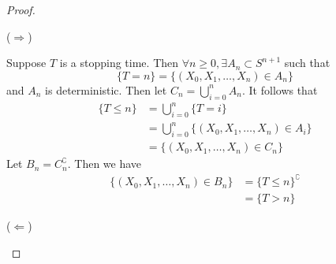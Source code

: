 \documentclass[
  coursecode={MTHE 455},
  assignmentname={Assignment \assignmentnumber},
  studentnumber=20053722,
  name={Bryan Hoang},
  draft,
]{
  ltxanswer%
}
\begin{document}
  \begin{questions}
    \setcounter{question}{\questionnumber}
    \addtocounter{question}{-1}
    \question[5]\
    \begin{parts}
      \part{}
      \begin{solution}
        \begin{proof}
          \begin{proofpart}
            (\(\Rightarrow\))

            Suppose \(T\) is a stopping time. Then \(\forall n \ge 0, \exists A_{n} \subset S^{n+1}\) such that
            \begin{equation*}
              \{T=n\} = \{(X_{0},X_{1},\dotsc,X_{n}) \in A_{n}\}
            \end{equation*}
            and \(A_{n}\) is deterministic. Then let \(C_{n} = \bigcup_{i=0}^{n} A_{n}\). It follows that
            \begin{align*}
              \{T \le n\} &= \bigcup_{i=0}^{n} \{T = i\}                                \\
                          &= \bigcup_{i=0}^{n} \{(X_{0},X_{1},\dotsc,X_{n}) \in A_{i}\} \\
                          &= \{(X_{0},X_{1},\dotsc,X_{n}) \in C_{n}\}
            \end{align*}
            Let \(B_{n} = C_{n}^{\complement}\). Then we have
            \begin{align*}
              \{(X_{0},X_{1},\dotsc,X_{n}) \in B_{n}\} &= \{T \le n\}^{\complement} \\
                                                       &= \{T > n\}
            \end{align*}
          \end{proofpart}
          \begin{proofpart}
            (\(\Leftarrow\))


\end{proofpart}
\end{proof}
\end{solution}
\end{parts}
\end{questions}
\end{document}
